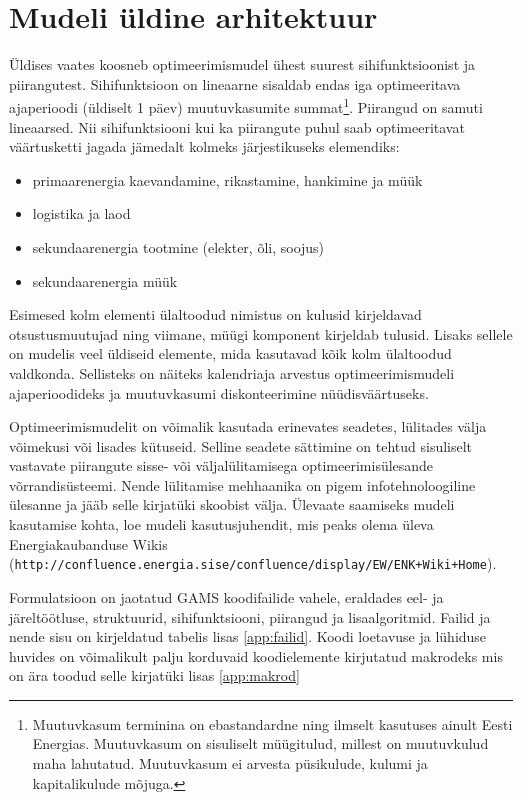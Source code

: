 \documentclass[10pt,a4paper]{article}
\begin{document}
\section{Mudeli üldine arhitektuur}
Üldises vaates koosneb optimeerimismudel ühest suurest sihifunktsioonist ja piirangutest. Sihifunktsioon on lineaarne sisaldab endas iga optimeeritava ajaperioodi (üldiselt 1 päev) muutuvkasumite summat\footnote{Muutuvkasum terminina on ebastandardne ning ilmselt kasutuses ainult Eesti Energias. Muutuvkasum on sisuliselt müügitulud, millest on muutuvkulud maha lahutatud. Muutuvkasum ei arvesta püsikulude, kulumi ja kapitalikulude mõjuga.}. Piirangud on samuti lineaarsed. Nii sihifunktsiooni kui ka piirangute puhul saab optimeeritavat väärtusketti jagada jämedalt kolmeks järjestikuseks elemendiks:

\begin{itemize}
\item primaarenergia kaevandamine, rikastamine, hankimine ja müük
\item logistika ja laod
\item sekundaarenergia tootmine (elekter, õli, soojus)
\item sekundaarenergia müük 
\end{itemize}

Esimesed kolm elementi ülaltoodud nimistus on kulusid kirjeldavad otsustusmuutujad ning viimane, müügi komponent kirjeldab tulusid. Lisaks sellele on mudelis veel üldiseid elemente, mida kasutavad kõik kolm ülaltoodud valdkonda. Sellisteks on näiteks kalendriaja arvestus optimeerimismudeli ajaperioodideks ja muutuvkasumi diskonteerimine nüüdisväärtuseks.

Optimeerimismudelit on võimalik kasutada erinevates seadetes, lülitades välja võimekusi või lisades kütuseid. Selline seadete sättimine on tehtud sisuliselt vastavate piirangute sisse- või väljalülitamisega optimeerimisülesande võrrandi\-süsteemi. Nende lülitamise mehhaanika on pigem infotehnoloogiline ülesanne ja jääb selle kirjatüki skoobist välja. Ülevaate saamiseks mudeli kasutamise kohta, loe mudeli kasutusjuhendit, mis peaks olema üleva Energiakaubanduse Wikis (\texttt{http://confluence.energia.sise/confluence/display/EW/ENK+Wiki+Home}).

Formulatsioon on jaotatud GAMS koodifailide vahele, eraldades eel- ja järel\-töötluse, struktuurid, sihifunktsiooni, piirangud ja lisaalgoritmid. Failid ja nende sisu on kirjeldatud tabelis lisas \ref{app:failid}. Koodi loetavuse ja lühiduse huvides on võimalikult palju korduvaid koodielemente kirjutatud makrodeks mis on ära toodud selle kirjatüki lisas \ref{app:makrod}
\end{document}
